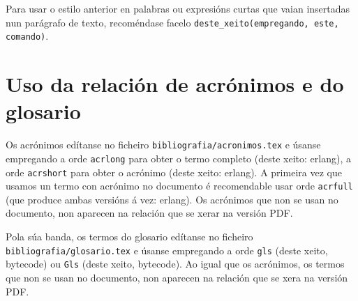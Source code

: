 Para usar o estilo anterior en palabras ou expresións curtas que vaian insertadas nun
parágrafo de texto, recoméndase facelo \lstinline{deste_xeito(empregando, este, comando)}.

\section{Uso da relación de acrónimos e do glosario}

Os acrónimos edítanse no ficheiro \texttt{bibliografia/acronimos.tex}
e úsanse empregando a orde \texttt{acrlong} para obter o termo
completo (deste xeito: \acrlong{erlang}), a orde \texttt{acrshort}
para obter o acrónimo (deste xeito: \acrshort{erlang}). A primeira vez
que usamos un termo con acrónimo no documento é recomendable usar orde
\texttt{acrfull} (que produce ambas versións á vez:
\acrfull{erlang}). Os acrónimos que non se usan no documento, non
aparecen na relación que se xerar na versión PDF.

Pola súa banda, os termos do glosario edítanse no ficheiro
\texttt{bibliografia/glo\-sa\-rio.tex} e úsanse empregando a orde
\texttt{gls} (deste xeito, \gls{bytecode}) ou \texttt{Gls} (deste
xeito, \Gls{bytecode}). Ao igual que os acrónimos, os termos que non
se usan no documento, non aparecen na relación que se xera na versión
PDF.
